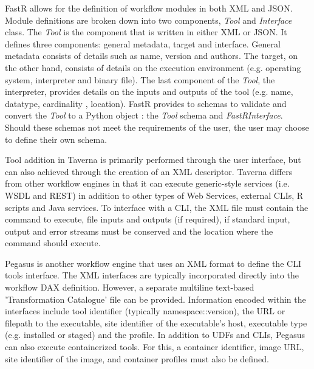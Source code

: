             FastR allows for the definition of workflow modules in both XML and
            JSON. Module definitions are broken down into two components,
            \textit{Tool} and \textit{Interface} class. The \textit{Tool} is the
            component that is written in either XML or JSON. It defines three
            components: general metadata, target and interface. General metadata
            consists of details such as name, version and authors. The target,
            on the other hand, consists of details on the execution environment
            (e.g. operating system, interpreter and binary file). The last
            component of the \textit{Tool}, the interpreter, provides details on
            the inputs and outputs of the tool (e.g. name, datatype, cardinality
            , location). FastR provides to schemas to validate and convert the
            \textit{Tool} to a Python object : the \textit{Tool} schema and
            \textit{FastRInterface}. Should these schemas not meet the
            requirements of the user, the user may choose to define their own
            schema.

            Tool addition in Taverna is primarily performed through the user
            interface, but can also achieved through the creation of an XML
            descriptor. Taverna differs from other workflow engines in that it
            can execute generic-style services (i.e. WSDL and REST) in addition
            to other types of Web Services, external CLIs, R scripts and Java
            services. To interface with a CLI, the XML file must contain the
            command to execute, file inputs and outputs (if required), if
            standard input, output and error streams must be conserved and the
            location where the command should execute.

            Pegasus is another workflow engine that uses an XML format to define
            the CLI tools interface. The XML interfaces are typically
            incorporated directly into the workflow DAX definition. However, a
            separate multiline text-based 'Transformation Catalogue' file can be
            provided. Information encoded within the interfaces include tool
            identifier (typically namespace::version), the URL or filepath to
            the executable, site identifier of the executable's host, executable
            type (e.g. installed or staged) and the profile. In addition to UDFs
            and CLIs, Pegasus can also execute containerized tools. For this, a
            container identifier, image URL, site identifier of the image, and
            container profiles must also be defined.

